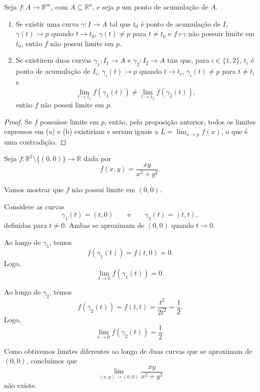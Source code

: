 \begin{corollary}
    Seja $f:A\to\mathbb R^m$, com $A\subseteq\mathbb R^n$, e seja $p$ um ponto de acumulação de $A$.

    \begin{enumerate}[label=(\alph*)]
        \item Se existir uma curva $\gamma:I\to A$ tal que $t_0$ é ponto de acumulação de $I$, $\gamma(t)\to p$ quando $t\to t_0$, $\gamma(t)\neq p$ para $t\neq t_0$ e $f\circ\gamma$ não possuir limite em $t_0$, então $f$ não possui limite em $p$.
        \item Se existirem duas curvas $\gamma_1:I_1\to A$ e $\gamma_2:I_2\to A$ tais que, para $i \in \{1,2\}$, $t_i$ é ponto de acumulação de $I_i$, $\gamma_i(t)\to p$ quando $t\to t_i$, $\gamma_i(t)\neq p$ para $t\neq t_i$ e
        \[
            \lim_{t\to t_1}f(\gamma_1(t))
            \neq
            \lim_{t\to t_2}f(\gamma_2(t)),
        \]
        então $f$ não possui limite em $p$.
    \end{enumerate}
\end{corollary}

\begin{proof}
    Se $f$ possuísse limite em $p$, então, pela proposição anterior, todos os limites expressos em (a) e (b) existiriam e seriam iguais a $L=\lim_{x\to p}f(x)$, o que é uma contradição.
\end{proof}
\begin{example}
    Seja $f:\mathbb R^2\setminus\{(0,0)\}\to\mathbb R$ dada por
    \[
        f(x,y)=\frac{xy}{x^2+y^2}.
    \]

    Vamos mostrar que $f$ não possui limite em $(0,0)$.

    Considere as curvas
    \[
        \gamma_1(t)=(t,0)
        \qquad\text{e}\qquad
        \gamma_2(t)=(t,t),
    \]
    definidas para $t\neq 0$.
    Ambas se aproximam de $(0,0)$ quando $t\to 0$.

    Ao longo de $\gamma_1$, temos
    \[
        f(\gamma_1(t))=f(t,0)=0.
    \]
    Logo,
    \[
        \lim_{t\to 0}f(\gamma_1(t))=0.
    \]

    Ao longo de $\gamma_2$, temos
    \[
        f(\gamma_2(t))=f(t,t)=\frac{t^2}{2t^2}=\frac{1}{2}.
    \]
    Logo,
    \[
        \lim_{t\to 0}f(\gamma_2(t))=\frac{1}{2}.
    \]

    Como obtivemos limites diferentes ao longo de duas curvas que se aproximam de $(0,0)$, concluímos que
    \[
        \lim_{(x,y)\to(0,0)}\frac{xy}{x^2+y^2}
    \]
    não existe.
\end{example}

